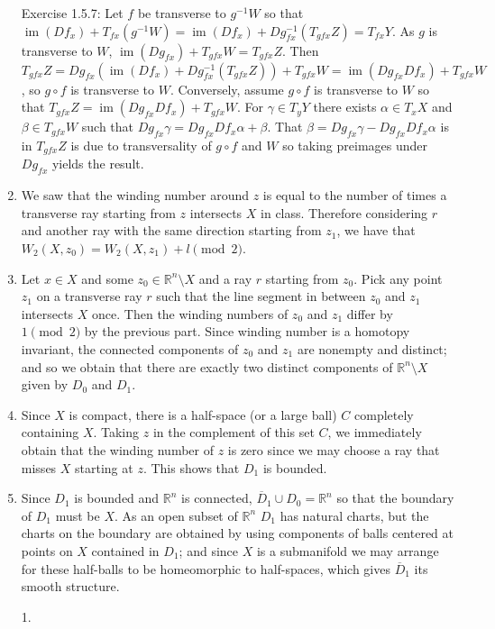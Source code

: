 \documentclass[11pt,leqno]{article}
\theoremstyle{plain}
\theoremstyle{definition}
\numberwithin{equation}{section}
\numberwithin{lem}{section}
\DeclareMathOperator{\im}{im}
\begin{document}
\begin{enumerate}
    Exercise 1.5.7: Let $f$ be transverse to $g^{-1}W$ so that $\im(Df_x) + T_{fx}(g^{-1}W) = \im(Df_x) + Dg_{fx}^{-1}(T_{gfx}Z) = T_{fx}Y$. As $g$ is transverse to $W$, $\im(Dg_{fx}) + T_{gfx}W = T_{gfx}Z$. Then $T_{gfx}Z = Dg_{fx}(\im(Df_x) + Dg_{fx}^{-1}(T_{gfx}Z)) + T_{gfx}W = \im(Dg_{fx}Df_x) + T_{gfx}W$, so $g\circ f$ is transverse to $W$. Conversely, assume $g\circ f$ is transverse to $W$ so that $T_{gfx}Z = \im(Dg_{fx}Df_x) + T_{gfx}W$. For $\gamma\in T_yY$ there exists $\alpha\in T_xX$ and $\beta\in T_{gfx}W$ such that $Dg_{fx}\gamma = Dg_{fx}Df_x\alpha + \beta$. That $\beta = Dg_{fx}\gamma - Dg_{fx}Df_x\alpha$ is in $T_{gfx}Z$ is due to transversality of $g\circ f$ and $W$ so taking preimages under $Dg_{fx}$ yields the result.
    \item We saw that the winding number around $z$ is equal to the number of times a transverse ray starting from $z$ intersects $X$ in class. Therefore considering $r$ and another ray with the same direction starting from $z_1$, we have that $W_2(X,z_0) = W_2(X,z_1)+l\pmod 2$.
    \item Let $x\in X$ and some $z_0\in \mathbb R^n\setminus X$ and a ray $r$ starting from $z_0$. Pick any point $z_1$ on a transverse ray $r$ such that the line segment in between $z_0$ and $z_1$ intersects $X$ once. Then the winding numbers of $z_0$ and $z_1$ differ by $1\pmod 2$ by the previous part. Since winding number is a homotopy invariant, the connected components of $z_0$ and $z_1$ are nonempty and distinct; and so we obtain that there are exactly two distinct components of $\mathbb R^n\setminus X$ given by $D_0$ and $D_1$.
    \item Since $X$ is compact, there is a half-space (or a large ball) $C$ completely containing $X$. Taking $z$ in the complement of this set $C$, we immediately obtain that the winding number of $z$ is zero since we may choose a ray that misses $X$ starting at $z$. This shows that $D_1$ is bounded.
    \item Since $D_1$ is bounded and $\mathbb R^n$ is connected, $\overline D_1\cup D_0 = \mathbb R^n$ so that the boundary of $D_1$ must be $X$. As an open subset of $\mathbb R^n$ $D_1$ has natural charts, but the charts on the boundary are obtained by using components of balls centered at points on $X$ contained in $D_1$; and since $X$ is a submanifold we may arrange for these half-balls to be homeomorphic to half-spaces, which gives $\overline D_1$ its smooth structure.
    \item[1.] \begin{enumerate}

\end{enumerate}
\end{enumerate}
\end{document}
